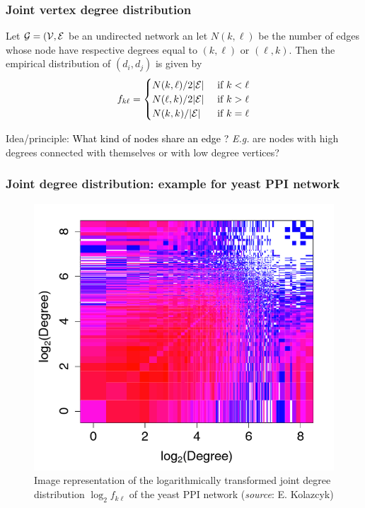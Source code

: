 \documentclass{beamer}\usepackage[]{graphicx}\usepackage[]{color}
\begin{document}
\begin{frame}
  \frametitle{Joint vertex degree distribution}

  \begin{definition}
    Let $\mathcal{G} = (\mathcal{V},\mathcal{E}$ be an undirected network an let $N(k,\ell)$ be the number of edges whose node have respective degrees equal to $(k,\ell)$ or $(\ell,k)$. Then the empirical distribution of $(d_i,d_j)$ is given by
    \[
      f_{k\ell} = \begin{cases}
      N(k,\ell)/2|\mathcal{E}| & \text{ if } k < \ell \\
      N(\ell,k)/2|\mathcal{E}| & \text{ if } k > \ell \\
      N(k,k)/|\mathcal{E}| & \text{ if } k = \ell \\
      \end{cases}
    \]
  \end{definition}

  \vfill  
  
  \begin{block}{Idea/principle: \textcolor{black}{What kind of nodes share an edge ? }}
    \textit{E.g.} are nodes with high degrees connected with themselves or with low degree vertices?
  \end{block}
  
\end{frame}

\begin{frame}
  \frametitle{Joint degree distribution: example for yeast PPI network}

  \begin{figure}[htbp]
  \centering
  \includegraphics[width=.6\textwidth]{figures/joint_degree_yeast}
  \caption{Image representation of the logarithmically transformed joint degree distribution $\log_2 f_{k\ell}$ of the yeast PPI network (\textit{source}: E. Kolazcyk)}
  \end{figure}
  
\end{frame}
\end{document}
